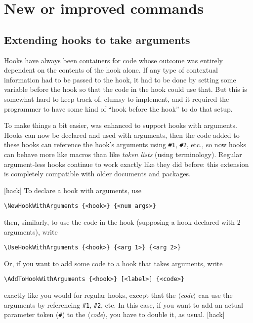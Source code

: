 \documentclass{ltnews}
\providecommand\meta[1]{$\langle$\textrm{\itshape#1}$\rangle$}
\begin{document}
\section{New or improved commands}

\subsection{Extending hooks to take arguments}

Hooks have always been containers for code whose outcome was entirely
dependent on the contents of the hook alone.  If any type of contextual
information had to be passed to the hook, it had to be done by setting
some variable before the hook so that the code in the hook could use
that.  But this is somewhat hard to keep track of, clumsy to implement,
and it required the programmer to have some kind of \enquote{hook before
the hook} to do that setup.

To make things a bit easier,  was enhanced to support hooks
with arguments.  Hooks can now be declared and used with arguments, then
the code added to these hooks can reference the hook's arguments using
\verb|#1|, \verb|#2|, etc., so now hooks can behave more like macros
than like \emph{token lists} (using  terminology).  Regular
argument-less hooks continue to work exactly like they did before:  this
extension is completely compatible with older documents and packages.

[hack]{\small}
To declare a hook with arguments, use
\begin{verbatim}
\NewHookWithArguments {<hook>} {<num args>}
\end{verbatim}
then, similarly, to use the code in the hook (supposing a hook declared
with 2 arguments), write
\begin{verbatim}
\UseHookWithArguments {<hook>} {<arg 1>} {<arg 2>}
\end{verbatim}

Or, if you want to add some code to a hook that takes arguments, write
\begin{verbatim}
\AddToHookWithArguments {<hook>} [<label>] {<code>}
\end{verbatim}
exactly like you would for regular hooks, except that the \meta{code}
can use the arguments by referencing \verb|#1|, \verb|#2|, etc.  In this
case, if you want to add an actual parameter token (\verb|#|) to the
\meta{code}, you have to double it, as usual.
[hack]
\end{document}
